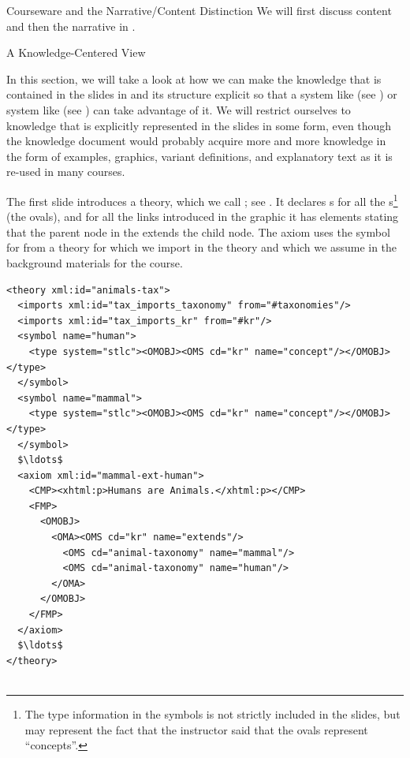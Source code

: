 \begin{tchapter}[id=courseware]{Courseware and the Narrative/Content Distinction}
We will first discuss content {\omdoc} and then the narrative {\omdoc} in
{}.

\begin{tsection}[id=knowledge-centered]{A Knowledge-Centered View}
  
  In this section, we will take a look at how we can make the knowledge that is contained
  in the slides in {} and its structure explicit so that a
  {} system like {\mbase} (see {}) or
  {} system like {\activemath} (see
  {}) can take advantage of it. We will restrict ourselves to
  knowledge that is explicitly represented in the slides in some form, even though the
  knowledge document would probably acquire more and more knowledge in the form of
  examples, graphics, variant definitions, and explanatory text as it is re-used in many
  courses.

The first slide introduces a theory, which we call {}; see
{}.  It declares {s} for all the
{s}\footnote{The type information in the symbols is not strictly
  included in the slides, but may represent the fact that the instructor said that
  the ovals represent ``concepts''.}  (the ovals), and for all the links
introduced in the graphic it has {} elements stating that the
parent node in the {} extends the child node. The axiom uses the
symbol for {} from a theory {} for
{} which we import in the theory and which we
assume in the background materials for the course.

\begin{lstlisting}[label=lst:ann-tax,mathescape,
    caption={The {\omdoc} Representation for Slide 1 from {\myfigref{15-211}}},
    index={theory,axiom,symbol,CMP,FMP,OMA,OMOBJ,OMS,private,data}]
<theory xml:id="animals-tax">
  <imports xml:id="tax_imports_taxonomy" from="#taxonomies"/>
  <imports xml:id="tax_imports_kr" from="#kr"/>
  <symbol name="human">
    <type system="stlc"><OMOBJ><OMS cd="kr" name="concept"/></OMOBJ></type>
  </symbol>
  <symbol name="mammal">
    <type system="stlc"><OMOBJ><OMS cd="kr" name="concept"/></OMOBJ></type>
  </symbol>
  $\ldots$
  <axiom xml:id="mammal-ext-human">
    <CMP><xhtml:p>Humans are Animals.</xhtml:p></CMP>
    <FMP>
      <OMOBJ>
        <OMA><OMS cd="kr" name="extends"/>
          <OMS cd="animal-taxonomy" name="mammal"/>
          <OMS cd="animal-taxonomy" name="human"/>
        </OMA>
      </OMOBJ>
    </FMP>
  </axiom>
  $\ldots$
</theory>


\end{lstlisting}
\end{tsection}
\end{tchapter}

